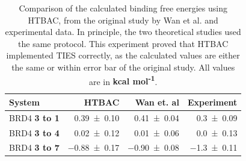 \begin{table}
  \centering
  \caption{Comparison of the calculated binding free energies using HTBAC,
  from the original study by Wan et al. and experimental data. In
  principle, the two theoretical studies used the same
  protocol. This experiment proved that HTBAC implemented TIES correctly, as
  the calculated values are either the same or within error bar of the
  original study. All values are in \textbf{kcal mol\textsuperscript{-1}}.}  
  \begin{tabular}{lrrr}
    \toprule
    System & HTBAC & Wan et. al & Experiment \\
    \midrule
    BRD4 \textbf{3 to 1} & \num{0.39 +- 0.10} &   \num{0.41 +- 0.04} &  \num{0.3 +- 0.09} \\
    BRD4 \textbf{3 to 4} & \num{0.02 +- 0.12} &   \num{0.01 +- 0.06} &  \num{0.0 +- 0.13} \\
    BRD4 \textbf{3 to 7} & \num{-0.88 +- 0.17} &  \num{-0.90 +- 0.08} & \num{-1.3 +- 0.11} \\
    \bottomrule
  \end{tabular}
  \label{tab:exp2}
\end{table}





